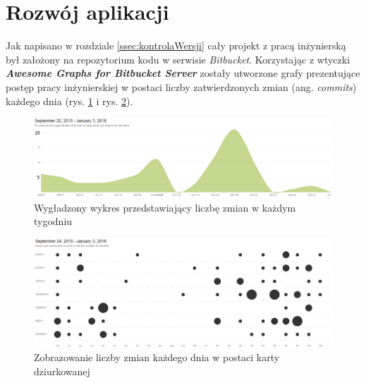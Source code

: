 \section{Rozwój aplikacji}
Jak napisano w rozdziale \ref{ssec:kontrolaWersji} cały projekt z pracą inżynierską był założony na repozytorium kodu w serwisie \textit{Bitbucket}. Korzystając z wtyczki \textit{\textbf{Awesome Graphs for Bitbucket Server}} zostały utworzone grafy prezentujące postęp pracy inżynierskiej w postaci liczby zatwierdzonych zmian (ang. \emph{commits}) każdego dnia (rys. \ref{fig:rozwoj1} i rys. \ref{fig:rozwoj2}).
\begin{figure}
	\centering
	\includegraphics[width=\textwidth]{./img/wykres1}
	\caption{Wygładzony wykres przedstawiający liczbę zmian w każdym tygodniu}
	\label{fig:rozwoj1}
\end{figure}
\begin{figure}
	\centering
	\includegraphics[width=\textwidth]{./img/wykres2}
	\caption{Zobrazowanie liczby zmian każdego dnia w postaci karty dziurkowanej}
	\label{fig:rozwoj2}
\end{figure}